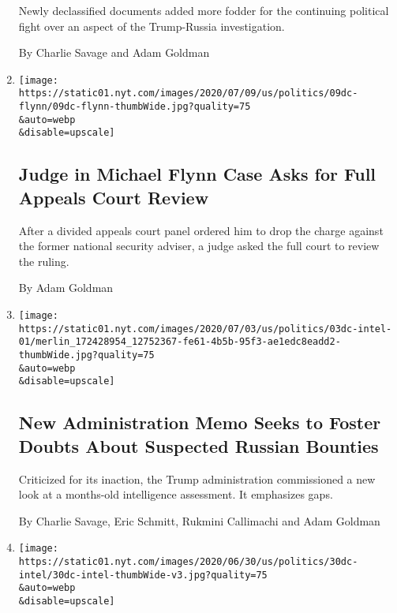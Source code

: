 \begin{enumerate}
  Newly declassified documents added more fodder for the continuing
  political fight over an aspect of the Trump-Russia investigation.

  By Charlie Savage and Adam Goldman
\item
  \href{/2020/07/09/us/politics/michael-flynn-appeals-court.html}{}

  \texttt{[image: https://static01.nyt.com/images/2020/07/09/us/politics/09dc-flynn/09dc-flynn-thumbWide.jpg?quality=75\\\&auto=webp\\\&disable=upscale]}

  \hypertarget{judge-in-michael-flynn-case-asks-for-full-appeals-court-review}{%
  \subsection{Judge in Michael Flynn Case Asks for Full Appeals Court
  Review}\label{judge-in-michael-flynn-case-asks-for-full-appeals-court-review}}

  After a divided appeals court panel ordered him to drop the charge
  against the former national security adviser, a judge asked the full
  court to review the ruling.

  By Adam Goldman
\item
  \href{/2020/07/03/us/politics/memo-russian-bounties.html}{}

  \texttt{[image: https://static01.nyt.com/images/2020/07/03/us/politics/03dc-intel-01/merlin\_172428954\_12752367-fe61-4b5b-95f3-ae1edc8eadd2-thumbWide.jpg?quality=75\\\&auto=webp\\\&disable=upscale]}

  \hypertarget{new-administration-memo-seeks-to-foster-doubts-about-suspected-russian-bounties}{%
  \subsection{New Administration Memo Seeks to Foster Doubts About
  Suspected Russian
  Bounties}\label{new-administration-memo-seeks-to-foster-doubts-about-suspected-russian-bounties}}

  Criticized for its inaction, the Trump administration commissioned a
  new look at a months-old intelligence assessment. It emphasizes gaps.

  By Charlie Savage, Eric Schmitt, Rukmini Callimachi and Adam Goldman
\item
  \href{/2020/06/30/us/politics/russian-bounties-afghanistan-intelligence.html}{}

  \texttt{[image: https://static01.nyt.com/images/2020/06/30/us/politics/30dc-intel/30dc-intel-thumbWide-v3.jpg?quality=75\\\&auto=webp\\\&disable=upscale]}


\end{enumerate}
